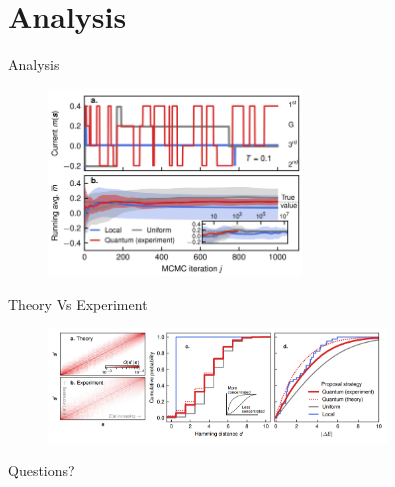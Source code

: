 \documentclass[
    10pt,
    aspectratio=169,
]{beamer}
\begin{document}
\section{Analysis}
\begin{frame}{Analysis}
    \begin{figure}
        \centering
        \includegraphics[width=0.6\textwidth]{2.png}
    \end{figure}
\end{frame}

\begin{frame}{Theory Vs Experiment}
    \begin{figure}
        \centering
        \includegraphics[width=0.8\textwidth]{3.png}
    \end{figure}
\end{frame}

\begin{frame}
    \begin{center}
        {\LARGE Questions?}
    \end{center}
\end{frame}
\end{document}
